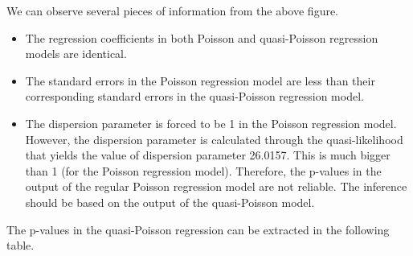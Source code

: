 \documentclass[
]{book}
\newenvironment{Shaded}{\begin{snugshade}}{\end{snugshade}}
\newcommand{\AttributeTok}[1]{\textcolor[rgb]{0.13,0.29,0.53}{#1}}
\newcommand{\FunctionTok}[1]{\textcolor[rgb]{0.13,0.29,0.53}{\textbf{#1}}}
\newcommand{\NormalTok}[1]{#1}
\newcommand{\OtherTok}[1]{\textcolor[rgb]{0.56,0.35,0.01}{#1}}
\newcommand{\SpecialCharTok}[1]{\textcolor[rgb]{0.81,0.36,0.00}{\textbf{#1}}}
\newcommand{\StringTok}[1]{\textcolor[rgb]{0.31,0.60,0.02}{#1}}
\begin{document}
We can observe several pieces of information from the above figure.

\begin{itemize}
\item
  The regression coefficients in both Poisson and quasi-Poisson regression models are identical.
\item
  The standard errors in the Poisson regression model are less than their corresponding standard errors in the quasi-Poisson regression model.
\item
  The dispersion parameter is forced to be 1 in the Poisson regression model. However, the dispersion parameter is calculated through the quasi-likelihood that yields the value of dispersion parameter 26.0157. This is much bigger than 1 (for the Poisson regression model). Therefore, the p-values in the output of the regular Poisson regression model are not reliable. The inference should be based on the output of the quasi-Poisson model.
\end{itemize}

The p-values in the quasi-Poisson regression can be extracted in the following table.

\begin{Shaded}
\end{Shaded}
\end{document}
